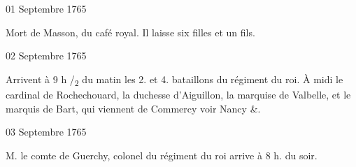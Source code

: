                      
                     

                     \begin{diary}{01 Septembre 1765}{}
                        
                         Mort de Masson, du café
                              royal. Il laisse
                           six filles et un fils. \bigskip
        
        
                     \end{diary}

                     \begin{diary}{02 Septembre 1765}{}
                        
                         Arrivent à 9 h /\textsubscript{2} du matin les 2.
                           et 4. bataillons du régiment du roi.
                           À midi le cardinal de Rochechouard, la
                              duchesse d'Aiguillon, la
                              marquise de
                              Valbelle, et le marquis de Bart, qui viennent
                           de Commercy voir Nancy &. \bigskip
        
        
                     \end{diary}

                     \begin{diary}{03 Septembre 1765}{}
                        
                        
                           M. le comte de Guerchy, colonel
                           du régiment du
                           roi arrive à 8 h. du soir. \bigskip
        
        
                     \end{diary}

